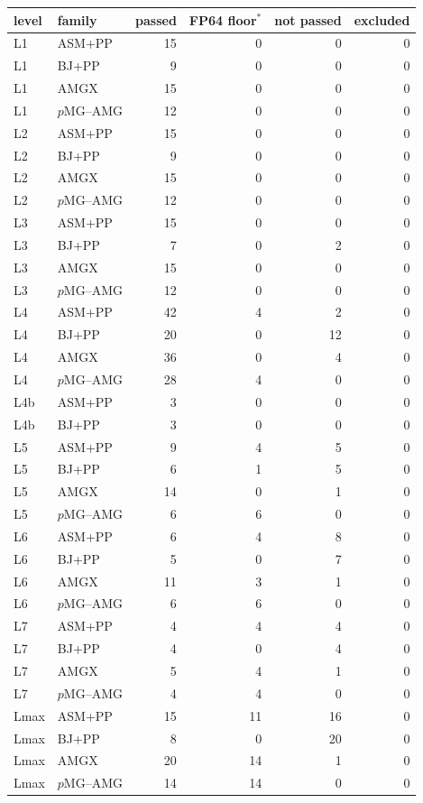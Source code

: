 \begin{tabular}{llrrrr}
\toprule
level & family & passed & FP64 floor$^*$ & not passed & excluded\\
\midrule
L1 & ASM+PP & 15 & 0 & 0 & 0\\
L1 & BJ+PP & 9 & 0 & 0 & 0\\
L1 & AMGX & 15 & 0 & 0 & 0\\
L1 & $p$MG--AMG & 12 & 0 & 0 & 0\\
L2 & ASM+PP & 15 & 0 & 0 & 0\\
L2 & BJ+PP & 9 & 0 & 0 & 0\\
L2 & AMGX & 15 & 0 & 0 & 0\\
L2 & $p$MG--AMG & 12 & 0 & 0 & 0\\
L3 & ASM+PP & 15 & 0 & 0 & 0\\
L3 & BJ+PP & 7 & 0 & 2 & 0\\
L3 & AMGX & 15 & 0 & 0 & 0\\
L3 & $p$MG--AMG & 12 & 0 & 0 & 0\\
L4 & ASM+PP & 42 & 4 & 2 & 0\\
L4 & BJ+PP & 20 & 0 & 12 & 0\\
L4 & AMGX & 36 & 0 & 4 & 0\\
L4 & $p$MG--AMG & 28 & 4 & 0 & 0\\
L4b & ASM+PP & 3 & 0 & 0 & 0\\
L4b & BJ+PP & 3 & 0 & 0 & 0\\
L5 & ASM+PP & 9 & 4 & 5 & 0\\
L5 & BJ+PP & 6 & 1 & 5 & 0\\
L5 & AMGX & 14 & 0 & 1 & 0\\
L5 & $p$MG--AMG & 6 & 6 & 0 & 0\\
L6 & ASM+PP & 6 & 4 & 8 & 0\\
L6 & BJ+PP & 5 & 0 & 7 & 0\\
L6 & AMGX & 11 & 3 & 1 & 0\\
L6 & $p$MG--AMG & 6 & 6 & 0 & 0\\
L7 & ASM+PP & 4 & 4 & 4 & 0\\
L7 & BJ+PP & 4 & 0 & 4 & 0\\
L7 & AMGX & 5 & 4 & 1 & 0\\
L7 & $p$MG--AMG & 4 & 4 & 0 & 0\\
Lmax & ASM+PP & 15 & 11 & 16 & 0\\
Lmax & BJ+PP & 8 & 0 & 20 & 0\\
Lmax & AMGX & 20 & 14 & 1 & 0\\
Lmax & $p$MG--AMG & 14 & 14 & 0 & 0\\
\bottomrule
\end{tabular}
